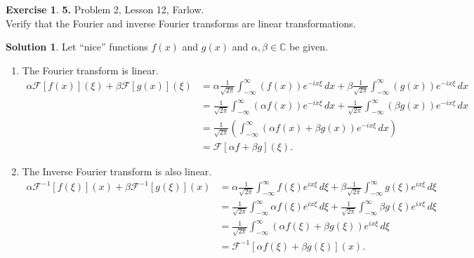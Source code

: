 \documentclass{book}
\theoremstyle{definition}
\newtheorem*{exer*}{Exercise}
\newtheorem*{sln*}{Solution}
\newcommand{\C}{\mathbb{C}}
\newcommand{\F}{\mathcal{F}}
\newcommand{\al}{\alpha}
\newcommand{\f}[2]{\frac{#1}{#2}}
\newcommand{\lp}{\left(}
\newcommand{\rp}{\right)}
\begin{document}
\begin{exer*}\textbf{5. }Problem 2, Lesson 12, Farlow.\\
	
	Verify that the Fourier and inverse Fourier transforms are linear transformations.
	
	\begin{sln*}
		Let ``nice'' functions $f(x)$ and $g(x)$ and $\alpha,\beta \in \C$ be given. \begin{enumerate}
			\item The Fourier transform is linear.
			\begin{align*}
			\alpha\F[ f(x)](\xi) + \beta\F[ g(x)](\xi) &= \alpha\f{1}{\sqrt{2\pi}}\int^\infty_{-\infty} ( f(x))e^{-ix\xi}\,dx + \beta\f{1}{\sqrt{2\pi}} \int^\infty_{-\infty} ( g(x))e^{-ix\xi}\,dx\\
			&=\f{1}{\sqrt{2\pi}}\int^\infty_{-\infty} (\alpha f(x))e^{-ix\xi}\,dx + \f{1}{\sqrt{2\pi}} \int^\infty_{-\infty} (\beta g(x))e^{-ix\xi}\,dx\\
			&= \f{1}{\sqrt{2\pi}}\lp \int^\infty_{-\infty}(\alpha f(x) + \beta g(x)) e^{-ix\xi}\,dx \rp\\
			&= \F[\alpha f + \beta g](\xi).  
			\end{align*}
			
			
			\item The Inverse Fourier transform is also linear.
			\begin{align*}
			\alpha \F^{-1}[f(\xi)](x) + \beta \F^{-1}[g(\xi)](x) &= \al \f{1}{\sqrt{2\pi}}\int^\infty_{-\infty} f(\xi)e^{ix\xi}\,d\xi + \beta \f{1}{\sqrt{2\pi}}\int^\infty_{-\infty} g(\xi) e^{ix\xi}\,d\xi\\
			&= \f{1}{\sqrt{2\pi}}\int^\infty_{-\infty} \al f(\xi)e^{ix\xi}\,d\xi +  \f{1}{\sqrt{2\pi}}\int^\infty_{-\infty} \beta g(\xi) e^{ix\xi}\,d\xi\\
			&= \f{1}{\sqrt{2\pi}}\int^\infty_{-\infty} (\alpha f(\xi) + \beta g(\xi)) e^{ix\xi}\,d\xi\\
			&= \F^{-1}[\alpha f(\xi) + \beta g(\xi)](x).
			\end{align*}
		\end{enumerate}	
	\end{sln*}
\end{exer*}

\newpage
\end{document}
